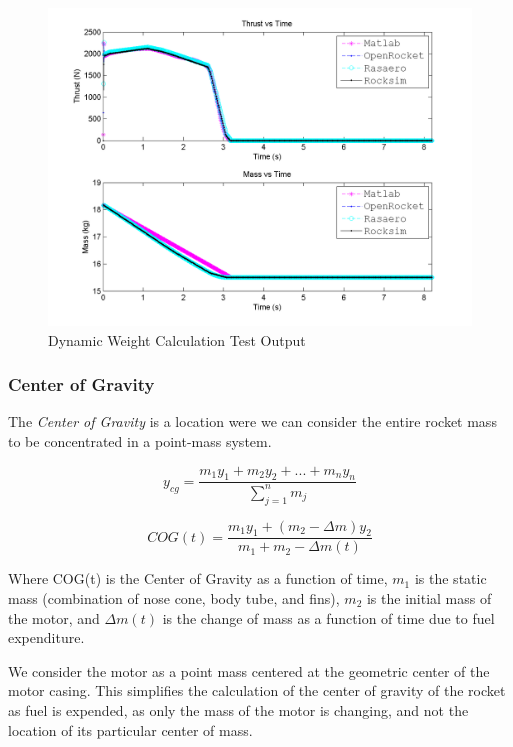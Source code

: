 \documentclass[]{article}
\begin{document}
\begin{figure}[htbp]
\centering
\includegraphics{images/plots/error_thrust_mass.png}
\caption{Dynamic Weight Calculation Test Output
\label{dynamic_weight_calculation_test_figure_label}}
\end{figure}

\subsubsection{Center of Gravity}\label{center-of-gravity}

The \emph{Center of Gravity} is a location were we can consider the
entire rocket mass to be concentrated in a point-mass system.

\begin{equation}
y_{cg} = \dfrac{m_1 y_1 + m_2 y_2 + ... + m_n y_n}{\sum_{j=1}^n m_j}
\end{equation}

\begin{equation}
COG(t) = \dfrac{m_1 y_1 + (m_2 - \Delta m) y_2}{m_1 + m_2 - \Delta m(t)} 
\end{equation}

Where COG(t) is the Center of Gravity as a function of time, \(m_1\) is
the static mass (combination of nose cone, body tube, and fins), \(m_2\)
is the initial mass of the motor, and \(\Delta m(t)\) is the change of
mass as a function of time due to fuel expenditure.

We consider the motor as a point mass centered at the geometric center
of the motor casing. This simplifies the calculation of the center of
gravity of the rocket as fuel is expended, as only the mass of the motor
is changing, and not the location of its particular center of mass.
\end{document}
